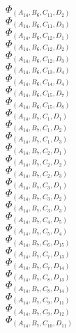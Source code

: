 \documentclass[14pt]{article}
\begin{document}
    $\Phi_{({A}_{14}, {B}_{6}, {C}_{11}, {D}_{2})}$ \\ 
    $\Phi_{({A}_{14}, {B}_{6}, {C}_{11}, {D}_{3})}$ \\ 
    $\Phi_{({A}_{14}, {B}_{6}, {C}_{12}, {D}_{1})}$ \\ 
    $\Phi_{({A}_{14}, {B}_{6}, {C}_{12}, {D}_{2})}$ \\ 
    $\Phi_{({A}_{14}, {B}_{6}, {C}_{12}, {D}_{3})}$ \\ 
    $\Phi_{({A}_{14}, {B}_{6}, {C}_{13}, {D}_{4})}$ \\ 
    $\Phi_{({A}_{14}, {B}_{6}, {C}_{14}, {D}_{4})}$ \\ 
    $\Phi_{({A}_{14}, {B}_{6}, {C}_{15}, {D}_{7})}$ \\ 
    $\Phi_{({A}_{14}, {B}_{6}, {C}_{15}, {D}_{8})}$ \\ 
    $\Phi_{({A}_{14}, {B}_{7}, {C}_{1}, {D}_{1})}$ \\ 
    $\Phi_{({A}_{14}, {B}_{7}, {C}_{1}, {D}_{2})}$ \\ 
    $\Phi_{({A}_{14}, {B}_{7}, {C}_{1}, {D}_{3})}$ \\ 
    $\Phi_{({A}_{14}, {B}_{7}, {C}_{2}, {D}_{1})}$ \\ 
    $\Phi_{({A}_{14}, {B}_{7}, {C}_{2}, {D}_{2})}$ \\ 
    $\Phi_{({A}_{14}, {B}_{7}, {C}_{2}, {D}_{3})}$ \\ 
    $\Phi_{({A}_{14}, {B}_{7}, {C}_{3}, {D}_{1})}$ \\ 
    $\Phi_{({A}_{14}, {B}_{7}, {C}_{3}, {D}_{2})}$ \\ 
    $\Phi_{({A}_{14}, {B}_{7}, {C}_{3}, {D}_{3})}$ \\ 
    $\Phi_{({A}_{14}, {B}_{7}, {C}_{4}, {D}_{5})}$ \\ 
    $\Phi_{({A}_{14}, {B}_{7}, {C}_{5}, {D}_{4})}$ \\ 
    $\Phi_{({A}_{14}, {B}_{7}, {C}_{6}, {D}_{15})}$ \\ 
    $\Phi_{({A}_{14}, {B}_{7}, {C}_{7}, {D}_{13})}$ \\ 
    $\Phi_{({A}_{14}, {B}_{7}, {C}_{7}, {D}_{14})}$ \\ 
    $\Phi_{({A}_{14}, {B}_{7}, {C}_{8}, {D}_{13})}$ \\ 
    $\Phi_{({A}_{14}, {B}_{7}, {C}_{8}, {D}_{14})}$ \\ 
    $\Phi_{({A}_{14}, {B}_{7}, {C}_{9}, {D}_{11})}$ \\ 
    $\Phi_{({A}_{14}, {B}_{7}, {C}_{9}, {D}_{12})}$ \\ 
    $\Phi_{({A}_{14}, {B}_{7}, {C}_{10}, {D}_{11})}$ \\ 
\end{document}
